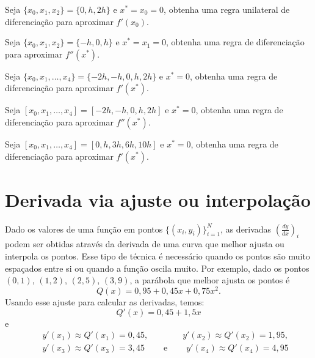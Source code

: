 \begin{exer}
Seja $\{x_0, x_1, x_2\}=\{0, h, 2h\}$ e $x^*=x_0=0$, obtenha uma regra unilateral de diferenciação para aproximar $f'(x_0)$.
\end{exer}

\begin{exer}
Seja $\{x_0, x_1, x_2\}=\{-h, 0, h\}$ e $x^*=x_1=0$, obtenha uma regra de diferenciação para aproximar $f''(x^*)$.
\end{exer}

\begin{exer}
Seja $\{x_0, x_1, \ldots, x_4\}=\{-2h, -h, 0, h, 2h\}$ e $x^*=0$, obtenha uma regra de diferenciação para aproximar $f'(x^*)$.
\end{exer}

\begin{exer}
Seja $[x_0,x_1,\ldots ,x_4]=[-2h,-h,0,h,2h]$ e $x^*=0$, obtenha uma regra de diferenciação para aproximar $f''(x^*)$.
\end{exer}

\begin{exer}
Seja $[x_0,x_1,\ldots ,x_4]=[0,h,3h,6h,10h]$ e $x^*=0$, obtenha uma regra de diferenciação para aproximar $f'(x^*)$.
\end{exer}

\section{Derivada via ajuste ou interpolação}

Dado os valores de uma função em pontos $\{(x_i,y_i)\}_{i=1}^N$, as derivadas $\left(\frac{dy}{dx}\right)_i$ podem ser obtidas através da derivada de uma curva que melhor ajusta ou interpola os pontos. Esse tipo de técnica é necessário quando os pontos são muito espaçados entre si ou quando a função oscila muito. Por exemplo, dado os pontos $(0,1)$, $(1,2)$, $(2,5)$, $(3,9)$, a parábola que melhor ajusta os pontos é
$$
Q(x)=0,95 + 0,45x + 0,75x^2.
$$
Usando esse ajuste para calcular as derivadas, temos:
$$
Q'(x)=0,45 + 1,5x
$$
e
\begin{eqnarray*}
&&y'(x_1)\approx Q'(x_1)=0,45, \qquad\qquad y'(x_2)\approx Q'(x_2)=1,95, \\&& y'(x_3)\approx Q'(x_3)=3,45 \qquad ~ \text{e} ~ \qquad y'(x_4)\approx Q'(x_4)=4,95
\end{eqnarray*}

